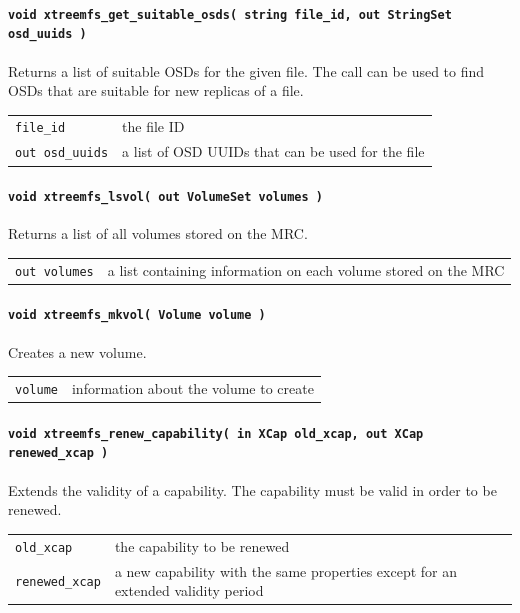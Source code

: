 \paragraph{\texttt{void xtreemfs\_get\_suitable\_osds( string file\_id, out StringSet osd\_uuids~)}}
Returns a list of suitable OSDs for the given file. The call can be used to find OSDs that are suitable for new replicas of a file.

\begin{tabularx}{\textwidth}{lX}
 \texttt{file\_id} & the file ID\\
 \texttt{out osd\_uuids} & a list of OSD\index{OSD} UUIDs that can be used for the file\\
\end{tabularx}

\paragraph{\texttt{void xtreemfs\_lsvol( out VolumeSet volumes )}}
Returns a list of all volumes stored on the MRC.

\begin{tabularx}{\textwidth}{lX}
 \texttt{out volumes} & a list containing information on each volume stored on the MRC\index{MRC}\\
\end{tabularx}

\paragraph{\texttt{void xtreemfs\_mkvol( Volume volume )}}
Creates a new volume.

\begin{tabularx}{\textwidth}{lX}
 \texttt{volume} & information about the volume to create\\
\end{tabularx}

\paragraph{\texttt{void xtreemfs\_renew\_capability( in XCap old\_xcap, out XCap renewed\_xcap~)}}
Extends the validity of a capability. The capability must be valid in order to be renewed.

\begin{tabularx}{\textwidth}{lX}
 \texttt{old\_xcap} & the capability to be renewed\\
 \texttt{renewed\_xcap} & a new capability with the same properties except for an extended validity period\\
\end{tabularx}

